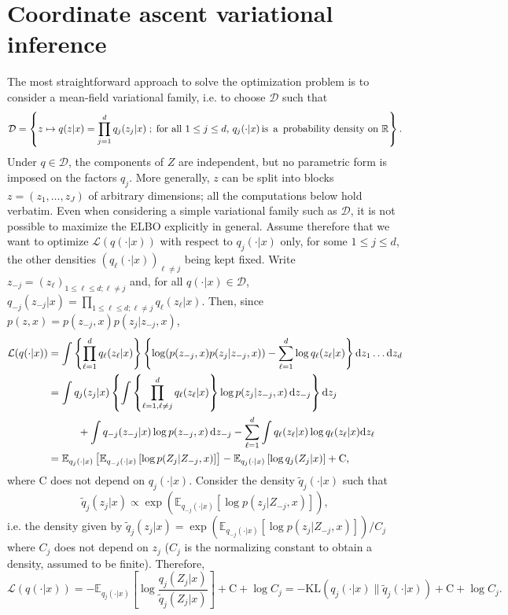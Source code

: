 \documentclass[english,graybox,envcountchap,envcountsame,sectrefs,shortlabels]{svmono}
\theoremstyle{style}
\newcommand{\eqsp}{}
\begin{document}
\section{Coordinate ascent variational inference}
\label{sec:cavi}
The most straightforward approach to solve the optimization problem is to consider a mean-field variational family, i.e. to choose $\mathcal{D}$ such that
$$
\mathcal{D} = \left\{z\mapsto q(z|x) = \prod_{j=1}^dq_j(z_j|x)\;;\; \mbox{for all $1\leq j\leq d$, } q_j(\cdot|x) \,\mbox{is\, a\, probability density on } \rset \right\}\eqsp.
$$
Under $q\in\mathcal{D}$, the components of $Z$ are independent, but no parametric form is imposed on the factors $q_j$. More generally, $z$ can be split into blocks $z = (z_1,\ldots,z_J)$ of arbitrary dimensions; all the computations below hold verbatim.
Even when considering a simple variational family such as $\mathcal{D}$, it is not possible to maximize the ELBO explicitly in general. Assume therefore that we want to optimize $\mathcal{L}(q(\cdot|x))$ with respect to $q_j(\cdot|x)$ only, for some $1\leq j \leq d$, the other densities $(q_\ell(\cdot|x))_{\ell\neq j}$ being kept fixed.
Write $z_{-j} = (z_\ell)_{1\leq \ell \leq d; \ell \neq j}$ and, for all $q(\cdot|x)\in \mathcal{D}$,  $q_{-j}(z_{-j}|x) = \prod_{1\leq \ell \leq d; \ell \neq j}q_{\ell}(z_{\ell}|x)$. Then, since $p(z,x) = p(z_{-j},x)p(z_j|z_{-j},x)$,
\begin{align*}
\mathcal{L}(q(\cdot|x)) &= \int \left\{\prod_{\ell=1}^dq_\ell(z_\ell|x)\right\} \left\{\log (p(z_{-j},x)p(z_j|z_{-j},x)) - \sum_{\ell=1}^d\log q_\ell(z_\ell|x)\right\}\rmd z_1\ldots \rmd z_d\\
&= \int q_j(z_j|x)\left\{\int \left\{\prod_{\ell=1, \ell\neq j}^dq_\ell(z_\ell|x)\right\} \log p(z_j|z_{-j},x)\,\rmd z_{-j}\right\}\rmd z_j \\
&\hspace{1cm}+\int q_{-j}(z_{-j}|x)\log p(z_{-j},x)\,\rmd z_{-j}- \sum_{\ell=1}^d\int q_\ell(z_\ell|x)\log q_\ell(z_\ell|x)\rmd z_\ell \\
&= \mathbb{E}_{q_j(\cdot|x)}\left[\mathbb{E}_{q_{-j}(\cdot|x)}\left[\log p(Z_j | Z_{-j},x)\right]\right] - \mathbb{E}_{q_j(\cdot|x)}\left[\log q_j(Z_j|x)\right]  + \mathrm{C}\eqsp,
\end{align*}
where $\mathrm{C}$ does not depend on $q_j(\cdot|x)$.
Consider the density $\tilde q_j(\cdot|x)$ such that
$$
\tilde q_j(z_j|x) \propto \exp\left(\mathbb{E}_{q_{-j}(\cdot|x)}\left[\log p(z_j | Z_{-j},x)\right]\right)\eqsp,
$$
i.e. the density given by $\tilde q_j(z_j|x)= \exp(\mathbb{E}_{q_{-j}(\cdot|x)}[\log p(z_j | Z_{-j},x)])/C_j$ where $C_j$ does not depend on $z_j$ ($C_j$ is the normalizing constant to obtain a density, assumed to be finite). Therefore,
$$
\mathcal{L}(q(\cdot|x)) = -\mathbb{E}_{q_j(\cdot|x)}\left[\log \frac{q_j(Z_j|x)}{\tilde q_j(Z_j|x) }\right]  + \mathrm{C} + \log C_j = -\mathrm{KL}(q_j(\cdot|x)\|\tilde q_j(\cdot|x))  + \mathrm{C} + \log C_j\eqsp.
$$
\end{document}
